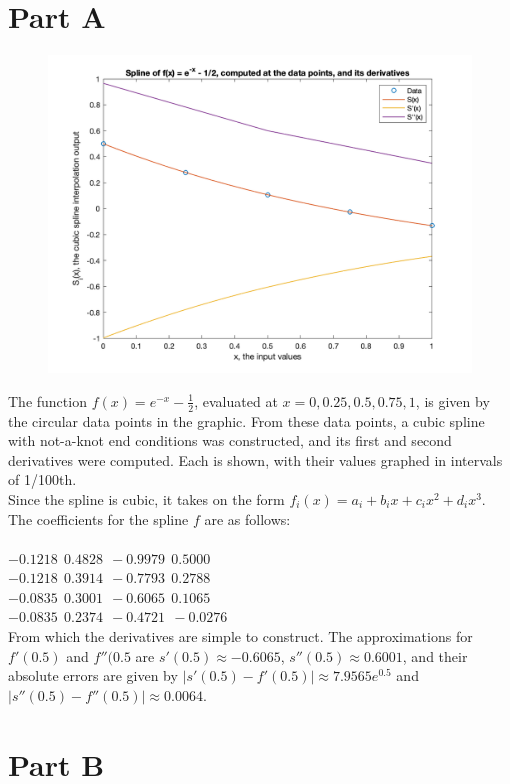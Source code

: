 \documentclass[11pt, oneside]{article}   	%
\date{}							%
\begin{document}
\section*{Part A}
\begin{figure}
\begin{flushright}
\includegraphics [scale=.25] {PartA.png}
\end{flushright}
\end{figure}

The function $f(x) = e^{-x} - \frac{1}{2}$, evaluated at $x = 0, 0.25, 0.5, 0.75, 1$, is given by the circular data points in the graphic. From these data points, a cubic spline with not-a-knot end conditions was constructed, and its first and second derivatives were computed. Each is shown, with their values graphed in intervals of 1/100th.\\

Since the spline is cubic, it takes on the form $f_i(x) = a_i + b_ix + c_ix^2 + d_ix^3$. The coefficients for the spline $f$ are as follows: \\

$~$\\
$   -0.1218  ~~  0.4828 ~~  -0.9979 ~~ 0.5000$\\
$   -0.1218  ~~ 0.3914 ~~  -0.7793  ~~  0.2788$\\
$   -0.0835  ~~  0.3001 ~~  -0.6065  ~~  0.1065$\\
$   -0.0835  ~~  0.2374 ~~  -0.4721 ~~  -0.0276$\\

From which the derivatives are simple to construct. The approximations for $f'(0.5)$ and $f''(0.5$ are $s'(0.5) \approx -0.6065$, $s''(0.5) \approx 0.6001$, and their absolute errors are given by $|s'(0.5) - f'(0.5)| \approx 7.9565e^{0.5}$ and $|s''(0.5) - f''(0.5)| \approx 0.0064$.

\section*{Part B}
\end{document}
